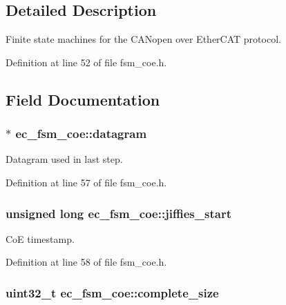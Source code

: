 \subsection{\-Detailed \-Description}
\-Finite state machines for the \-C\-A\-Nopen over \-Ether\-C\-A\-T protocol. 

\-Definition at line 52 of file fsm\-\_\-coe.\-h.



\subsection{\-Field \-Documentation}
\subsubsection[{datagram}]{$\ast$ {\bf ec\-\_\-fsm\-\_\-coe\-::datagram}}\label{structec__fsm__coe_a1de20f618cb8600ef37e05cd909ea4cf}


\-Datagram used in last step. 



\-Definition at line 57 of file fsm\-\_\-coe.\-h.

\subsubsection[{jiffies\-\_\-start}]{\setlength{\rightskip}{0pt plus 5cm}unsigned long {\bf ec\-\_\-fsm\-\_\-coe\-::jiffies\-\_\-start}}\label{structec__fsm__coe_acae779843d2dde4e1a02f4781d259d46}


\-Co\-E timestamp. 



\-Definition at line 58 of file fsm\-\_\-coe.\-h.

\subsubsection[{complete\-\_\-size}]{\setlength{\rightskip}{0pt plus 5cm}uint32\-\_\-t {\bf ec\-\_\-fsm\-\_\-coe\-::complete\-\_\-size}}\label{structec__fsm__coe_ac87498148a6733460b858339b554f0ce}


